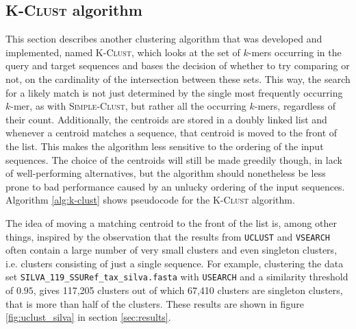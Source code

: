 \subsection{\textsc{K-Clust} algorithm}

This section describes another clustering algorithm that was developed and
implemented, named \textsc{K-Clust}, which looks at the set of $k$-mers
occurring in the query and target sequences and bases the decision of whether
to try comparing or not, on the cardinality of the intersection between these
sets. This way, the search for a likely match is not just determined by the
single most frequently occurring $k$-mer, as with \textsc{Simple-Clust}, but
rather all the occurring $k$-mers, regardless of their count. Additionally, the
centroids are stored in a doubly linked list and whenever a centroid matches a
sequence, that centroid is moved to the front of the list. This makes the
algorithm less sensitive to the ordering of the input sequences. The choice of
the centroids will still be made greedily though, in lack of well-performing
alternatives, but the algorithm should nonetheless be less prone to bad
performance caused by an unlucky ordering of the input sequences. Algorithm
\ref{alg:k-clust} shows pseudocode for the \textsc{K-Clust} algorithm.

The idea of moving a matching centroid to the front of the list is, among other
things, inspired by the observation that the results from \texttt{UCLUST} and
\texttt{VSEARCH} often contain a large number of very small clusters and even
singleton clusters, i.e. clusters consisting of just a single sequence. For
example, clustering the data set \texttt{SILVA\_119\_SSURef\_tax\_silva.fasta}
with \texttt{USEARCH} and a similarity threshold of $0.95$, gives 117,205
clusters out of which 67,410 clusters are singleton clusters, that is more than
half of the clusters. These results are shown in figure \ref{fig:uclust_silva}
in section \ref{sec:results}.


